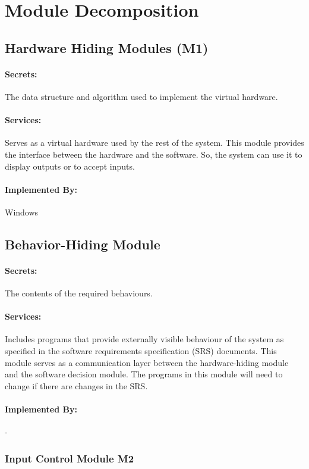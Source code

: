 \documentclass[12pt,letterpaper]{article}
\begin{document}
	\section{Module Decomposition}
	\subsection{Hardware Hiding Modules (M1)}
	\paragraph{Secrets: } The data structure and algorithm used to implement the virtual hardware.
	\paragraph{Services: } Serves as a virtual hardware used by the rest of the system. This module provides the interface between the hardware and the software. So, the system can use it to display outputs or to accept inputs.
	\paragraph{Implemented By: } Windows

	\subsection{Behavior-Hiding Module}
	\paragraph{Secrets: } The contents of the required behaviours.
	\paragraph{Services: }Includes programs that provide externally visible behaviour of the system as specified in the software requirements specification (SRS) documents. This module serves as a communication layer between the hardware-hiding module and the software decision module. The programs in this module will need to change if there are changes in the SRS.
	\paragraph{Implemented By: } -

	\subsubsection{Input Control Module M2}
\end{document}
